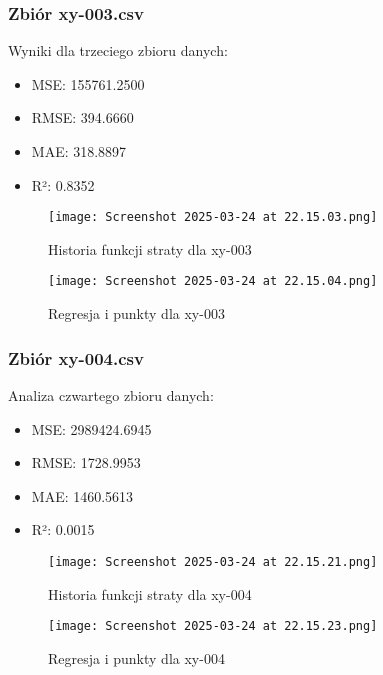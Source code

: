 \documentclass{article}
\begin{document}
\subsubsection{Zbiór xy-003.csv}
Wyniki dla trzeciego zbioru danych:
\begin{itemize}
    \item MSE: 155761.2500
    \item RMSE: 394.6660
    \item MAE: 318.8897
    \item R²: 0.8352
\end{itemize}

\begin{figure}[H]
    \centering
    \begin{minipage}{0.45\textwidth}
        \texttt{[image: Screenshot 2025-03-24 at 22.15.03.png]}
        \caption{Historia funkcji straty dla xy-003}
    \end{minipage}
    \hfill
    \begin{minipage}{0.45\textwidth}
        \texttt{[image: Screenshot 2025-03-24 at 22.15.04.png]}
        \caption{Regresja i punkty dla xy-003}
    \end{minipage}
\end{figure}

\subsubsection{Zbiór xy-004.csv}
Analiza czwartego zbioru danych:
\begin{itemize}
    \item MSE: 2989424.6945
    \item RMSE: 1728.9953
    \item MAE: 1460.5613
    \item R²: 0.0015
\end{itemize}

\begin{figure}[H]
    \centering
    \begin{minipage}{0.45\textwidth}
        \texttt{[image: Screenshot 2025-03-24 at 22.15.21.png]}
        \caption{Historia funkcji straty dla xy-004}
    \end{minipage}
    \hfill
    \begin{minipage}{0.45\textwidth}
        \texttt{[image: Screenshot 2025-03-24 at 22.15.23.png]}
        \caption{Regresja i punkty dla xy-004}
    \end{minipage}
\end{figure}
\end{document}
